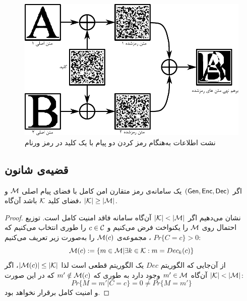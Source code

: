 \begin{figure}[h]
\centering
\includegraphics[width=0.7\linewidth]{Images/OTP_Misusage}
\caption{{\small نشت اطلاعات به‌هنگام رمز کردن دو پیام با یک کلید در رمز ورنام}}
\label{fig:OTP_Misusage}
\end{figure}



\subsection*{قضیه‌ی شانون}
\begin{theorem}
	\label{shanonth}
اگر
	$(\mathsf{Gen}, \mathsf{Enc}, \mathsf{Dec})$
	یک سامانه‌ی رمز متقارن امن کامل با فضای پیام اصلی 
	$\mathcal{M}$
و فضای کلید 
$\mathcal{K}$
باشد آن‌گاه،   
$|\mathcal{K}| \geq |\mathcal{M}|$.
\end{theorem}
\begin{proof}
	نشان می‌دهیم اگر 
	$|\mathcal{K}| < |\mathcal{M}|$
	آن‌گاه سامانه فاقد امنیت کامل است. توزیع احتمال روی 
	$\mathcal{M}$
	را یکنواخت فرض می‌کنیم و 
	$c\in\mathcal{C}$
	را طوری انتخاب می‌کنیم که 
	$Pr\{C = c\} > 0$
	،  مجموعه‌ی 
$\mathcal{M}(c)$
را به‌صورت زیر تعریف می‌کنیم:
$$\mathcal{M}(c):=\{m\in\mathcal{M}| \exists k\in\mathcal{K}: m = Dec_{k}(c)\}$$
از آن‌جایی که الگوریتم 
$Dec$
یک الگوریتم قطعی است لذا 
$|\mathcal{M}(c)| \leq |\mathcal{K}|$، 
اگر 
$|\mathcal{K}| < |\mathcal{M}|$
آن‌گاه  
$m'\in\mathcal{M}$
وجود دارد به طوری که 
$m'\notin\mathcal{M}(c)$
 که در این صورت:
 $$Pr\{M = m'| C = c\} = 0 \neq Pr\{M = m'\}$$
 و امنیت کامل برقرار نخواهد بود.
\end{proof}


